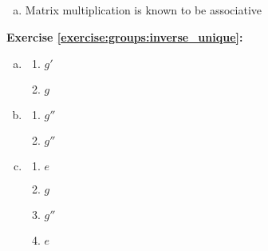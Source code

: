\begin{enumerate}[(a)]
\item
Matrix multiplication is known to be associative
\end{enumerate}

\noindent\textbf{Exercise \ref{exercise:groups:inverse_unique}:}
\begin{enumerate}[(a)]
\item
	\begin{multicols}{2}
	\begin{enumerate}[1.]
	\item
	$g'$
	
	\item
	$g$
	\end{enumerate}
	\end{multicols}
	
\item
	\begin{multicols}{2}
	\begin{enumerate}[1.]
	\item
	$g''$
	
	\item
	$g''$
	\end{enumerate}
	\end{multicols}
	
\item
	\begin{multicols}{2}
	\begin{enumerate}[1.]
	\item
	$e$
	
	\item
	$g$
	
	\item
	$g''$
	
	\item
	$e$
	\end{enumerate}
	\end{multicols}
\end{enumerate}


